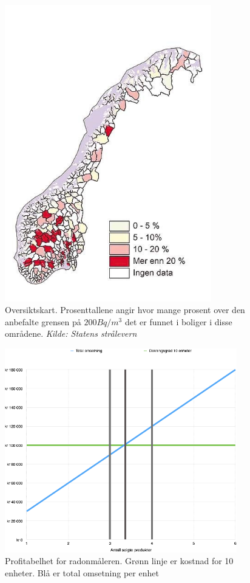 \begin{figure}[ht!]
\centering
\includegraphics[width=90mm]{straleskart.jpg}
\caption{Oversiktskart. Prosenttallene angir hvor mange prosent over den anbefalte grensen på $200Bq/m^3$ det er funnet i boliger i disse områdene.
\textit{Kilde: Statens strålevern}
}
\label{fig:oversiktskart}
\end{figure}

\begin{figure}[ht!]
    \begin{center}
    \includegraphics[width=0.9\textwidth]{graph.png}
    \caption{Profitabelhet for radonmåleren. Grønn linje er kostnad for 10 enheter. Blå er total omsetning per enhet}
    \label{fig:profitmargin}
    \end{center}
\end{figure}

